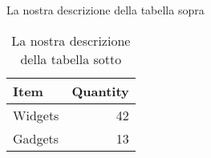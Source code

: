 \documentclass[]{article}
\begin{document}
    \begin{table}[h]
    \caption{La nostra descrizione della tabella sopra}
    \centering 
        \begin{tabular}{l|r} 
        Item & Quantity \\\hline %
        Widgets & 42 \\ %
        Gadgets & 13
        \end{tabular}
        \caption{La nostra descrizione della tabella sotto} %
    \end{table}

    \section{}
\end{document}
